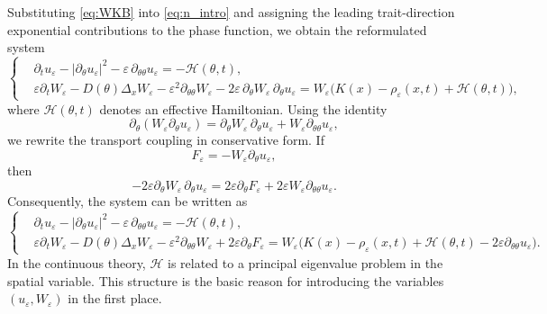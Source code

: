 \documentclass[11pt]{article}
\begin{document}
Substituting \eqref{eq:WKB} into \eqref{eq:n_intro} and assigning the leading trait-direction exponential contributions to the phase function, we obtain the reformulated system
\begin{equation}\label{eq:WKB_reformulation0}
\left\{
\begin{aligned}
& \partial_t u_\varepsilon
- |\partial_\theta u_\varepsilon|^2
- \varepsilon \, \partial_{\theta\theta} u_\varepsilon
= - \mathcal H(\theta,t), \\
& \varepsilon \partial_t W_\varepsilon
- D(\theta)\Delta_x W_\varepsilon
- \varepsilon^2 \partial_{\theta\theta} W_\varepsilon
- 2\varepsilon \, \partial_\theta W_\varepsilon \, \partial_\theta u_\varepsilon
= W_\varepsilon\bigl(K(x)-\rho_\varepsilon(x,t)+\mathcal H(\theta,t)\bigr),
\end{aligned}
\right.
\end{equation}
where \(\mathcal H(\theta,t)\) denotes an effective Hamiltonian. 
Using the identity
\[
\partial_\theta(W_\varepsilon\partial_\theta u_\varepsilon)
=
\partial_\theta W_\varepsilon\,\partial_\theta u_\varepsilon
+
W_\varepsilon\partial_{\theta\theta}u_\varepsilon,
\]
we rewrite the transport coupling in conservative form. If
\begin{equation}\label{def:F}
F_\varepsilon=-W_\varepsilon\partial_\theta u_\varepsilon,
\end{equation}
then
\[
-2\varepsilon\partial_\theta W_\varepsilon\,\partial_\theta u_\varepsilon
=
2\varepsilon\partial_\theta F_\varepsilon
+
2\varepsilon W_\varepsilon\partial_{\theta\theta}u_\varepsilon .
\]
Consequently, the system can be written as
\begin{equation}\label{eq:WKB_reformulation}
\left\{
\begin{aligned}
& \partial_t u_\varepsilon
- |\partial_\theta u_\varepsilon|^2
- \varepsilon \, \partial_{\theta\theta} u_\varepsilon
= - \mathcal H(\theta,t), \\
& \varepsilon \partial_t W_\varepsilon
- D(\theta)\Delta_x W_\varepsilon
- \varepsilon^2 \partial_{\theta\theta} W_\varepsilon
+2\varepsilon\partial_\theta F_\varepsilon
=
W_\varepsilon
\bigl(
K(x)-\rho_\varepsilon(x,t)
+\mathcal H(\theta,t)
-2\varepsilon\partial_{\theta\theta}u_\varepsilon
\bigr).
\end{aligned}
\right.
\end{equation}
In the continuous theory, \(\mathcal H\) is related to a principal eigenvalue problem in the spatial variable. This structure is the basic reason for introducing the variables \((u_\varepsilon,W_\varepsilon)\) in the first place.
\end{document}
